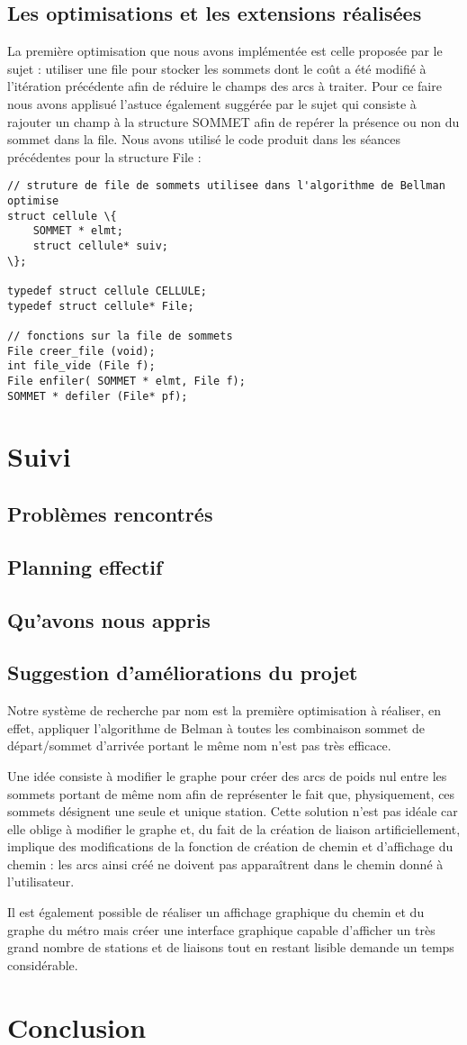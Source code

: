 \documentclass{report}
\begin{document}
\section{Les optimisations et les extensions réalisées}
La première optimisation que nous avons implémentée est celle proposée par le sujet : utiliser une file pour stocker les sommets dont le coût a été modifié à l'itération précédente afin de réduire le champs des arcs à traiter. Pour ce faire nous avons applisué l'astuce également suggérée par le sujet qui consiste à rajouter un champ à la structure SOMMET afin de repérer la présence ou non du sommet dans la file.
Nous avons utilisé le code produit dans les séances précédentes pour la structure File : 
\begin{lstlisting}
// struture de file de sommets utilisee dans l'algorithme de Bellman optimise
struct cellule \{
	SOMMET * elmt;
	struct cellule* suiv;
\};

typedef struct cellule CELLULE;
typedef struct cellule* File;

// fonctions sur la file de sommets
File creer_file (void);
int file_vide (File f);
File enfiler( SOMMET * elmt, File f);
SOMMET * defiler (File* pf);
\end{lstlisting}
\chapter{Suivi}
\section{Problèmes rencontrés}
\section{Planning effectif}
\section{Qu'avons nous appris}
\section{Suggestion d'améliorations du projet}
Notre système de recherche par nom est la première optimisation à réaliser, en effet, appliquer l'algorithme de Belman à toutes les combinaison sommet de départ/sommet d'arrivée portant le même nom n'est pas très efficace.
	
Une idée consiste à modifier le graphe pour créer des arcs de poids nul entre les sommets portant de même nom afin de représenter le fait que, physiquement, ces sommets désignent une seule et unique station. Cette solution n'est pas idéale car elle oblige à modifier le graphe et, du fait de la création de liaison artificiellement, implique des modifications de la fonction de création de chemin et d'affichage du chemin : les arcs ainsi créé ne doivent pas apparaîtrent dans le chemin donné à l'utilisateur.

\bigskip
Il est également possible de réaliser un affichage graphique du chemin et du graphe du métro mais créer une interface graphique capable d'afficher un très grand nombre de stations et de liaisons tout en restant lisible demande un temps considérable.
\chapter{Conclusion}
\end{document}
